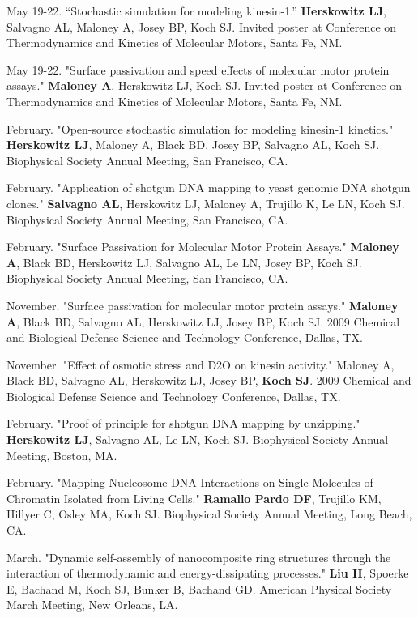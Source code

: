 \documentclass[11pt]{article}
\begin{document}
 May 19-22. “Stochastic simulation for modeling kinesin-1.” \textbf{Herskowitz LJ}, Salvagno AL, Maloney A, Josey BP, Koch SJ. Invited poster at Conference on Thermodynamics and Kinetics of Molecular Motors, Santa Fe, NM.

 May 19-22. "Surface passivation and speed effects of molecular motor protein assays." \textbf{Maloney A}, Herskowitz LJ, Koch SJ. Invited poster at Conference on Thermodynamics and Kinetics of Molecular Motors, Santa Fe, NM.

 February. "Open-source stochastic simulation for modeling kinesin-1 kinetics." \textbf{Herskowitz LJ}, Maloney A, Black BD, Josey BP, Salvagno AL, Koch SJ. Biophysical Society Annual Meeting, San Francisco, CA.

 February. "Application of shotgun DNA mapping to yeast genomic DNA shotgun clones." \textbf{Salvagno AL}, Herskowitz LJ, Maloney A, Trujillo K, Le LN, Koch SJ. Biophysical Society Annual Meeting, San Francisco, CA.

 February. "Surface Passivation for Molecular Motor Protein Assays." \textbf{Maloney A}, Black BD, Herskowitz LJ, Salvagno AL, Le LN, Josey BP, Koch SJ. Biophysical Society Annual Meeting, San Francisco, CA.

 November. "Surface passivation for molecular motor protein assays." \textbf{Maloney A}, Black BD, Salvagno AL, Herskowitz LJ, Josey BP, Koch SJ. 2009 Chemical and Biological Defense Science and Technology Conference, Dallas, TX.

 November. "Effect of osmotic stress and D2O on kinesin activity." Maloney A, Black BD, Salvagno AL, Herskowitz LJ, Josey BP, \textbf{Koch SJ}. 2009 Chemical and Biological Defense Science and Technology Conference, Dallas, TX.

 February. "Proof of principle for shotgun DNA mapping by unzipping." \textbf{Herskowitz LJ}, Salvagno AL, Le LN, Koch SJ.  Biophysical Society Annual Meeting, Boston, MA.

 February. "Mapping Nucleosome-DNA Interactions on Single Molecules of Chromatin Isolated from Living Cells." \textbf{Ramallo Pardo DF}, Trujillo KM, Hillyer C, Osley MA, Koch SJ.  Biophysical Society Annual Meeting, Long Beach, CA.

 March. "Dynamic self-assembly of nanocomposite ring structures through the interaction of thermodynamic and energy-dissipating processes." \textbf{Liu H}, Spoerke E, Bachand M, Koch SJ, Bunker B, Bachand GD.  American Physical Society March Meeting, New Orleans, LA.
\end{document}
